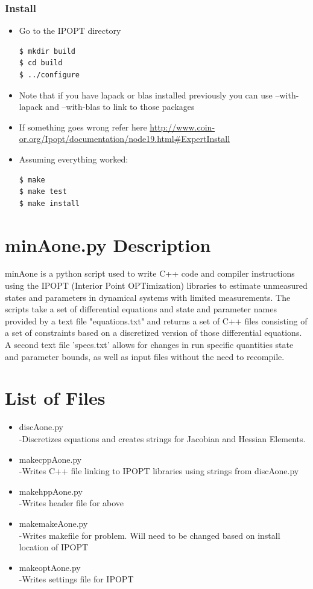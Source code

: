 \documentclass[11pt]{article}
\begin{document}
\subsubsection*{Install}
\begin{itemize}
\item Go to the IPOPT directory
\begin{verbatim}
$ mkdir build
$ cd build
$ ../configure
\end{verbatim}
\item Note that if you have lapack or blas installed previously you can use --with-lapack and --with-blas to link to those packages
\item If something goes wrong refer here \url{http://www.coin-or.org/Ipopt/documentation/node19.html#ExpertInstall}
\item Assuming everything worked:
\begin{verbatim}
$ make
$ make test
$ make install
\end{verbatim}
\end{itemize}


\section{minAone.py Description}
minAone is a python script used to write C++ code and compiler instructions using the IPOPT (Interior Point OPTimization) libraries to estimate unmeasured states and parameters in dynamical systems with limited measurements.  The scripts take a set of differential equations and state and parameter names provided by a text file "equations.txt" and returns a set of C++ files consisting of a set of constraints based on a discretized version of those differential equations.  A second text file 'specs.txt' allows for changes in run specific quantities state and parameter bounds, as well as input files without the need to recompile.


\section*{List of Files}
\begin{itemize}
\item discAone.py\\
	-Discretizes equations and creates strings for Jacobian and Hessian Elements.
\item makecppAone.py\\
	-Writes C++ file linking to IPOPT libraries using strings from discAone.py
\item makehppAone.py\\
	-Writes header file for above
\item makemakeAone.py\\
	-Writes makefile for problem.  Will need to be changed based on install location of IPOPT
\item makeoptAone.py\\
	-Writes settings file for IPOPT
\end{itemize}
\end{document}
